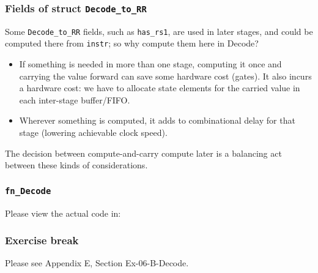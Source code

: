 
\begin{frame}[fragile]
\frametitle{Fields of struct {\tt Decode\_to\_RR}}

\footnotesize

Some {\tt Decode\_to\_RR} fields, such as \verb|has_rs1|, are used in
later stages, and could be computed there from \verb|instr|; so why
compute them here in Decode?

\vspace{4ex}

\begin{itemize}

 \item If something is needed in more than one stage, computing it
       once and carrying the value forward can save some hardware cost
       (gates).  It also incurs a hardware cost: we have to allocate
       state elements for the carried value in each inter-stage
       buffer/FIFO.

 \item Wherever something is computed, it adds to combinational delay
       for that stage (lowering achievable clock speed).

\end{itemize}

\vspace{4ex}

The decision between compute-and-carry {\vs} compute later is a
balancing act between these kinds of considerations.

\end{frame}


\begin{frame}
\frametitle{{\tt fn\_Decode}}

\footnotesize

\begin{center}\large
 Please view the actual code in: 
\end{center}

\end{frame}


\begin{frame}
\frametitle{\EmojiExercise \hmm Exercise break}

Please see Appendix E, Section Ex-06-B-Decode.

\end{frame}

